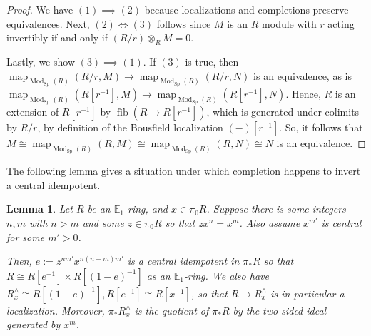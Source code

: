 \documentclass[12 pt]{amsart}
\theoremstyle{plain}
\newtheorem{lemma}[theorem]{Lemma}
\theoremstyle{definition}
\theoremstyle{remark}
\numberwithin{equation}{section}
\DeclareMathOperator\Sp{Sp}
\DeclareMathOperator\Mod{Mod}
\DeclareMathOperator\map{map}
\newcommand\EE{\mathbb{E}}
\DeclareMathOperator\fib{fib}
\begin{document}
\begin{proof}
	We have $(1) \implies (2)$ because localizations and completions preserve
	equivalences. Next,  $(2)\iff (3)$ follows since $M$ is an $R$ module with $r$
	acting invertibly if and only if $(R/r)\otimes_RM=0$. 
	
	Lastly, we show $(3) \implies (1)$. If $(3)$ is true, then
	$\map_{\Mod_{\Sp}(R)}(R/r,M) \to \map_{\Mod_{\Sp}(R)}(R/r,N)$ is an equivalence,
	as is $\map_{\Mod_{\Sp}(R)}(R[r^{-1}],M) \to \map_{\Mod_{\Sp}(R)}(R[r^{-1}],N)$.
	Hence, $R$ is an extension of $R[r^{-1}]$ by $\fib(R \to R[r^{-1}])$, which is
	generated under colimits by $R/r$, by definition of the Bousfield localization $(-)[r^{-1}]$.
	So, it follows that $M\cong \map_{\Mod_{\Sp}(R)}(R,M) \cong \map_{\Mod_{\Sp}(R)}(R,N) \cong N$ is an equivalence.
\end{proof}

The following lemma gives a situation under which completion happens to invert a central idempotent. 

\begin{lemma}\label{lemma:completionhomepi}
	Let $R$ be an $\EE_1$-ring, and $x\in\pi_0R$.
	Suppose there is some integers $n, m$ with $n > m$ and some $z \in
	\pi_0R$ so that $zx^n=x^m$. Also assume $x^{m'}$ is central for some $m'>0$.
	
	Then, $e:=z^{nm'}x^{n(n-m)m'}$ is a central idempotent in $\pi_*R$ so
	that $R\cong R[e^{-1}]\times R[(1-e)^{-1}]$ as an $\EE_1$-ring. 
	We also have $R^{\wedge}_x\cong R[(1-e)^{-1}], R[e^{-1}]\cong R[x^{-1}]$, so that $R \to R^{\wedge}_x$ is in particular a localization. Moreover, $\pi_*R^{\wedge}_x$ is the quotient of $\pi_*R$ by the two sided ideal generated by $x^m$.
\end{lemma}
\end{document}
